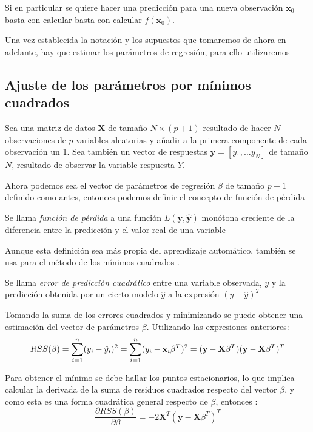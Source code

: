 \noindent Si en particular se quiere hacer una predicción para una nueva observación  $\mathbf{x}_0$ basta con calcular basta con calcular $f(\textbf{x}_0).$

Una vez establecida la notación y los supuestos que tomaremos de ahora en adelante, hay que estimar los parámetros de regresión, para ello utilizaremos 

\newpage
\subsection{Ajuste de los parámetros por mínimos cuadrados}
\noindent Sea una matriz de datos $\textbf{X}$ de tamaño $N\times (p+1)$ resultado de hacer $N$ observaciones de $p$ variables aleatorias y añadir a la primera componente de cada observación un 1. Sea también un vector de respuestas $\textbf{y}=[y_1,\ldots y_N]$ de tamaño $N$, resultado de observar la variable respuesta $Y$. 

\noindent Ahora podemos sea el vector de parámetros de regresión $\beta$ de tamaño $p+1$ definido como antes, entonces podemos definir el concepto de función de pérdida

\begin{defi}
Se llama \emph{función de pérdida} \cite{Hastie 2001} a una función $L(\textbf{y},\mathbf{\hat{y}})$ monótona creciente de la diferencia entre la predicción y el valor real de una variable
\end{defi}

\noindent Aunque esta definición sea más propia del aprendizaje automático, también se usa para el método de los mínimos cuadrados \cite{Abdi 2007}. 

\begin{defi}
Se llama \emph{error de predicción cuadrático} entre una variable observada, $y$ y la predicción obtenida por un cierto modelo $\hat{y}$ a la expresión $(y-\hat{y})^2$
\end{defi}

\noindent Tomando la suma de los errores cuadrados y minimizando se puede obtener una estimación  del vector de parámetros $\beta$. Utilizando las expresiones anteriores:
\begin{equation}
RSS(\beta)=\sum_{i=1}^n(y_i-\hat{y}_i)^2 = \sum_{i=1}^n(y_i-\textbf{x}_i\beta^T)^2=(\textbf{y}-\textbf{X}\beta^T)(\textbf{y}-\textbf{X}\beta^T)^T\\
\end{equation}

\noindent Para obtener el mínimo se debe hallar los puntos estacionarios, lo que implica calcular la derivada de la suma de residuos cuadrados respecto del vector $\beta$, y como esta es una forma cuadrática general respecto de $\beta$, entonces \cite{Morrison 1976}:
\begin{equation}
\dfrac{\partial RSS(\beta)}{\partial \beta}= -2\mathbf{X}^T(\mathbf{y}-\mathbf{X}\beta^T)^T
\end{equation}

